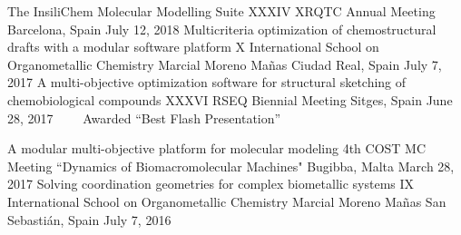 
\newpage


\begin{cventries}

  \cventry
    {The InsiliChem Molecular Modelling Suite} %
    {XXXIV XRQTC Annual Meeting} %
    {Barcelona, Spain} %
    {July 12, 2018} %
    {}
  \cventry
    {Multicriteria optimization of chemostructural drafts with a modular software platform} %
    {X International School on Organometallic Chemistry Marcial Moreno Mañas} %
    {Ciudad Real, Spain} %
    {July 7, 2017} %
    {}
  \cventry
    {A multi-objective optimization software for structural sketching of chemobiological compounds} %
    {XXXVI RSEQ Biennial Meeting} %
    {Sitges, Spain} %
    {June 28, 2017} %
    {~~~~\footnotesize{\faTag\acvHeaderIconSep\acvHeaderIconSep Awarded ``Best Flash Presentation''}}

  \cventry
    {A modular multi-objective platform for molecular modeling} %
    {4th COST MC Meeting ``Dynamics of Biomacromolecular Machines"} %
    {Bugibba, Malta} %
    {March 28, 2017} %
    {}
  \cventry
    {Solving coordination geometries for complex biometallic systems} %
    {IX International School on Organometallic Chemistry Marcial Moreno Mañas} %
    {San Sebastián, Spain} %
    {July 7, 2016} %
    {}
\end{cventries}
